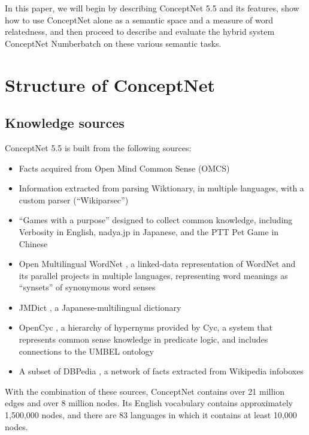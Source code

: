 \documentclass[letterpaper]{article}
\begin{document}
In this paper, we will begin by describing ConceptNet 5.5 and its features,
show how to use ConceptNet alone as a semantic space and a measure of word
relatedness, and then proceed to describe and evaluate the hybrid system
ConceptNet Numberbatch on these various semantic tasks.

\section{Structure of ConceptNet}\label{structure-of-conceptnet}


\subsection{Knowledge sources}\label{knowledge-sources}

ConceptNet 5.5 is built from the following sources:

\begin{itemize}
\item
  Facts acquired from Open Mind Common Sense (OMCS) \cite{singh2002omcs}
\item
  Information extracted from parsing Wiktionary, in multiple languages,
  with a custom parser (``Wikiparsec'')
\item
  ``Games with a purpose'' designed to collect common knowledge,
  including Verbosity \cite{vonahn2006verbosity} in English, nadya.jp
  \cite{nakahara2011nadya} in Japanese, and the PTT Pet Game
  \cite{kuo2009petgame} in Chinese
\item
  Open Multilingual WordNet \cite{bond2013linking}, a linked-data
  representation of WordNet \cite{miller1998wordnet} and its parallel
  projects in multiple languages, representing word meanings as
  ``synsets'' of synonymous word senses
\item
  JMDict \cite{breen2004jmdict}, a Japanese-multilingual dictionary
\item
  OpenCyc \cite{matuszek2006cyc}, a hierarchy of hypernyms provided by
  Cyc, a system that represents common sense knowledge in predicate
  logic, and includes connections to the UMBEL ontology
  \cite{bergman2008umbel}
\item
  A subset of DBPedia \cite{auer2007dbpedia}, a network of facts
  extracted from Wikipedia infoboxes
\end{itemize}

With the combination of these sources, ConceptNet contains over 21
million edges and over 8 million nodes. Its English vocabulary contains
approximately 1,500,000 nodes, and there are 83 languages in which it
contains at least 10,000 nodes.
\end{document}
